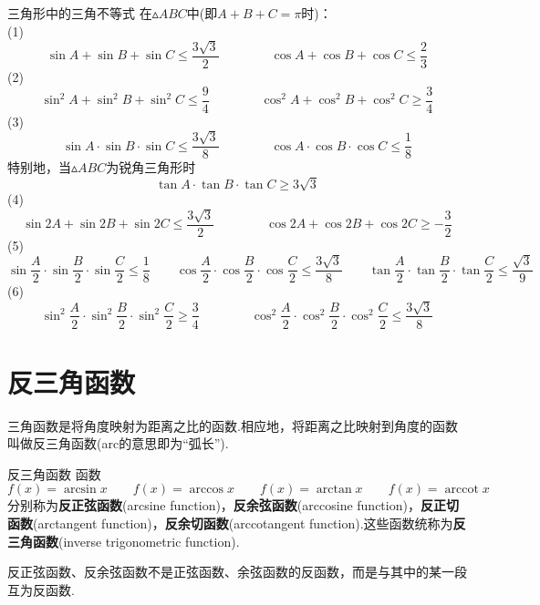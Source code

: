 \documentclass[lang=cn, zihao=4.5]{elegantbook}
\DeclareMathOperator{\arccot}{arccot}
\begin{document}
\begin{proposition}{三角形中的三角不等式} %
    在$\vartriangle ABC$中(即$A+B+C=\pi$时)：\\
    (1)$$\sin A + \sin B + \sin C \leq \frac{ 3\sqrt{3} }{2} \qquad \qquad \cos A + \cos B + \cos C \leq \frac{2}{3}$$
    (2)$$\sin ^2 A + \sin ^2 B + \sin ^2 C \leq \frac{9}{4} \qquad \qquad \cos ^2 A + \cos ^2 B + \cos ^2 C \geq \frac{3}{4}$$
    (3)$$\sin A \cdot \sin B \cdot \sin C \leq \frac{ 3\sqrt{3} }{8} \qquad \qquad \cos A \cdot \cos B \cdot \cos C \leq \frac{1}{8}$$
    特别地，当$\vartriangle ABC$为锐角三角形时
    $$\tan A \cdot \tan B \cdot \tan C \geq 3\sqrt{3}$$
    (4)
    $$\sin 2A + \sin 2B + \sin 2C \leq \frac{ 3\sqrt{3} }{2} \qquad \qquad \cos 2A + \cos 2B + \cos 2C \geq -\frac{3}{2}$$
    (5)
    $$\sin \frac{A}{2} \cdot \sin \frac{B}{2} \cdot \sin \frac{C}{2} \leq \frac{1}{8} \qquad \cos \frac{A}{2} \cdot \cos \frac{B}{2} \cdot \cos \frac{C}{2} \leq \frac{3 \sqrt{3}}{8} \qquad \tan \frac{A}{2} \cdot \tan \frac{B}{2} \cdot \tan \frac{C}{2} \leq \frac{\sqrt{3}}{9}$$
    (6)$$\sin ^2 \frac{A}{2} \cdot \sin ^2 \frac{B}{2} \cdot \sin ^2 \frac{C}{2} \geq \frac{3}{4} \qquad \qquad \cos ^2 \frac{A}{2} \cdot \cos ^2 \frac{B}{2} \cdot \cos ^2 \frac{C}{2} \leq \frac{3 \sqrt{3}}{8}$$
\end{proposition}

\section{反三角函数}

三角函数是将角度映射为距离之比的函数.相应地，将距离之比映射到角度的函数叫做反三角函数(arc的意思即为“弧长”).

\begin{definition}{反三角函数}
    函数$$f(x)=\arcsin{x} \qquad f(x)=\arccos{x} \qquad f(x)=\arctan{x} \qquad f(x)=\arccot{x}$$
    分别称为\textbf{反正弦函数}(arcsine function)，\textbf{反余弦函数}(arccosine function)，\textbf{反正切函数}(arctangent function)，\textbf{反余切函数}(arccotangent function).这些函数统称为\textbf{反三角函数}(inverse trigonometric function).
\end{definition}
\begin{note}
    反正弦函数、反余弦函数不是正弦函数、余弦函数的反函数，而是与其中的某一段互为反函数.
\end{note}
\end{document}
